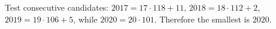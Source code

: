 Test consecutive candidates: $2017=17\cdot118+11$, $2018=18\cdot112+2$, $2019=19\cdot106+5$, while $2020=20\cdot101$. Therefore the smallest is $\boxed{2020}$.
